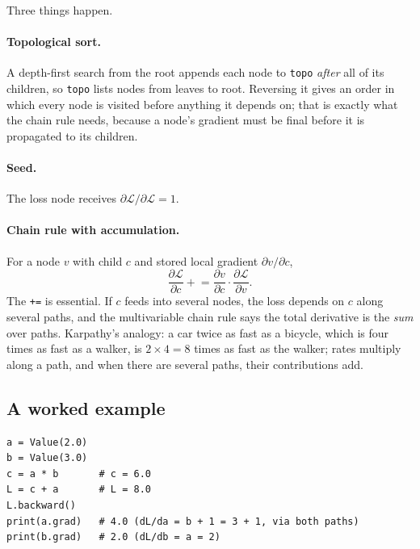 \documentclass[11pt,letterpaper]{article}
\theoremstyle{remark}
\newcommand{\code}[1]{\lstinline[basicstyle=\ttfamily\small]|#1|}
\newcommand{\dd}[2]{\frac{\partial #1}{\partial #2}}
\begin{document}
Three things happen.

\paragraph{Topological sort.} A depth-first search from the root appends each node to \code{topo} \emph{after} all of its children, so \code{topo} lists nodes from leaves to root. Reversing it gives an order in which every node is visited before anything it depends on; that is exactly what the chain rule needs, because a node's gradient must be final before it is propagated to its children.

\paragraph{Seed.} The loss node receives $\partial\mathcal L/\partial \mathcal L = 1$.

\paragraph{Chain rule with accumulation.} For a node $v$ with child $c$ and stored local gradient $\partial v/\partial c$,
\begin{equation}
\dd{\mathcal L}{c} \mathrel{+}= \dd{v}{c}\cdot\dd{\mathcal L}{v}. \label{eq:chain}
\end{equation}
The \code{+=} is essential. If $c$ feeds into several nodes, the loss depends on $c$ along several paths, and the multivariable chain rule says the total derivative is the \emph{sum} over paths. Karpathy's analogy: a car twice as fast as a bicycle, which is four times as fast as a walker, is $2\times 4 = 8$ times as fast as the walker; rates multiply along a path, and when there are several paths, their contributions add.

\subsection{A worked example}

\begin{lstlisting}
a = Value(2.0)
b = Value(3.0)
c = a * b       # c = 6.0
L = c + a       # L = 8.0
L.backward()
print(a.grad)   # 4.0 (dL/da = b + 1 = 3 + 1, via both paths)
print(b.grad)   # 2.0 (dL/db = a = 2)
\end{lstlisting}
\end{document}
